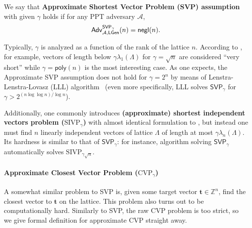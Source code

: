 \documentclass[../../book.tex]{subfiles}
\begin{document}
\begin{definition}\label{def:approximate-svp-assumption}
    We say that \textbf{Approximate Shortest Vector Problem (SVP) assumption}
    with given $\gamma$ holds if for any PPT adversary $\mathcal{A}$,
    \begin{equation*}
        \mathsf{Adv}^{\mathsf{SVP}_{\gamma}}_{\mathcal{A},\mathsf{LGen}}(n) = \mathsf{negl}(n).
    \end{equation*}
\end{definition}

Typically, $\gamma$ is analyzed as a function of the rank of the lattice $n$.
According to \cite[Section 2.2.5]{KoenWessel25}, for example, vectors of length below $\gamma\lambda_1(\Lambda)$ for $\gamma = \sqrt{n}$ are considered ``very short'' while $\gamma = \mathsf{poly}(n)$ is the most interesting case.
As one expects, the Approximate SVP assumption does not hold for $\gamma=2^{n}$ by means of Lenstra-Lenstra-Lovasz (LLL) algorithm~\cite{LenLenLov82} (even more specifically, LLL solves $\mathsf{SVP}_{\gamma}$ for $\gamma > 2^{(n\log\log n)/\log n}$).

Additionally, one commonly introduces \textbf{(approximate) shortest independent vectors problem ($\text{SIVP}_{\gamma}$)} with almost identical formulation to , but instead one must find $n$ linearly independent vectors of lattice $\Lambda$ of length at most $\gamma\lambda_{n}(\Lambda)$.
Its hardness is similar to that of $\mathsf{SVP}_{\gamma}$: for instance, algorithm solving $\mathsf{SVP}_{\gamma}$ automatically solves $\text{SIVP}_{\gamma\sqrt{n}}$.

\paragraph{Approximate Closest Vector Problem ($\text{CVP}_{\gamma}$)}\label{section:approximate-cvp}
A somewhat similar problem to SVP is, given some target vector $\mathbf{t} \in \mathbb{Z}^{n}$, find the closest vector to $\mathbf{t}$ on the lattice.
This problem also turns out to be computationally hard.
Similarly to SVP, the raw CVP problem is too strict, so we give formal definition for approximate CVP straight away.
\end{document}
